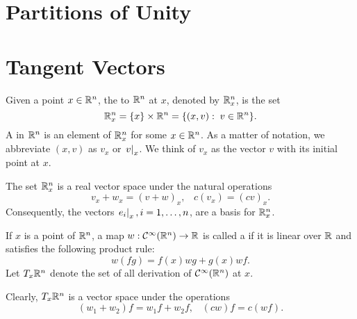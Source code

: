 \documentclass[11pt,a4paper]{article}
\begin{document}
\section{Partitions of Unity}

\section{Tangent Vectors}

\begin{definition}
Given a point $x\in \mathbb{R}^n$, the  to $\mathbb{R}^n$ at $x$, denoted by $\mathbb{R}^n_x$, is the set 
$$\mathbb{R}^n_x = \{x\}\times \mathbb{R}^n = \{(x,v):\;v\in\mathbb{R}^n\}.$$ 
A  in $\mathbb{R}^n$ is an element of $\mathbb{R}^n_x$ for some $x \in \mathbb{R}^n$. As a matter of notation, we abbreviate $(x,v)$ as $v_x$ or $\left.v\right|_{x}$. We think of $v_x$ as the vector $v$ with its initial point at $x$.
\end{definition}

\begin{note}
The set $\mathbb{R}^n_x$ is a real vector space under the natural operations
$$v_x + w_x = (v+w)_x,\;\;\; c(v_x) = (cv)_x.$$
Consequently, the vectors $\left.e_i\right|_{x}, i = 1,\ldots, n$, are a basis for $\mathbb{R}^n_x$.
\end{note}

\begin{definition}
If $x$ is a point of $\mathbb{R}^n$, a map $w:\mathcal{C}^\infty(\mathbb{R}^n)\rightarrow \mathbb{R}$ is called a  if it is linear over $\mathbb{R}$ and satisfies the following product rule:
$$
w(fg) = f(x)wg + g(x)wf.
$$
Let $T_x\mathbb{R}^n$ denote the set of all derivation of $\mathcal{C}^\infty(\mathbb{R}^n)$ at $x$.
\end{definition}

\begin{note}
Clearly, $T_x\mathbb{R}^n$ is a vector space under the operations
$$ (w_1+w_2)f = w_1f+w_2f, \;\;\; (cw)f = c(wf). $$
\end{note}
\end{document}

